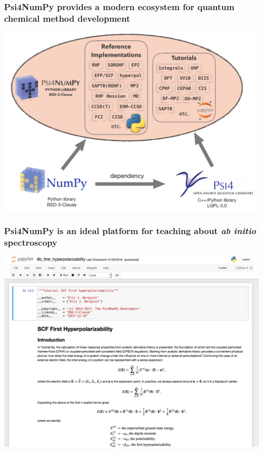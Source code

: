 \documentclass[%
    xcolor=usenames,dvipsnames,svgnames%
]{beamer}
\newenvironment{nscenter}
 {\parskip=0pt\par\nopagebreak\centering}
 {\par\noindent\ignorespacesafterend}
\newcommand\pfn{Psi4NumPy}
\begin{document}
\begin{frame}
  \frametitle{\pfn{} provides a modern ecosystem for quantum chemical method development}
  \begin{nscenter}
    \includegraphics[width=\linewidth,keepaspectratio]{./figures/psi4numpy_ecosystem22.pdf}
  \end{nscenter}
\end{frame}

\begin{frame}
  \frametitle{\pfn{} is an ideal platform for teaching about \textit{ab initio} spectroscopy}
  \begin{nscenter}
    \includegraphics[width=\linewidth,keepaspectratio]{./figures/psi4numpy_notebook_1.png}
  \end{nscenter}
\end{frame}
\end{document}
